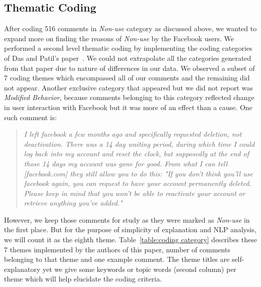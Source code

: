 \subsection{Thematic Coding}
After coding 516 comments in \emph{Non-use} category as discussed above, we wanted to expand more on finding the reasons of \emph{Non-use} by the Facebook users. We performed a second level thematic coding by implementing the coding categories of Das and Patil's paper~\cite{das2017resistance}. We could not extrapolate all the categories generated from that paper due to nature of differences in our data. We observed a subset of 7 coding themes which encompassed all of our comments and the remaining did not appear. Another exclusive category that appeared but we did not report was \textit{Modified Behavior}, because comments belonging to this category reflected change in user interaction with Facebook but it was more of an effect than a cause. One such comment is:

\begin{quote}
    \textit{I left facebook a few months ago and specifically requested deletion, not deactivation. There was a 14 day waiting period, during which time I could log back into my account and reset the clock, but supposedly at the end of those 14 days my account was gone for good. From what I can tell [facebook.com] they still allow you to do this: "If you don't think you'll use facebook again, you can request to have your account permanently deleted. Please keep in mind that you won't be able to reactivate your account or retrieve anything you've added."}

\end{quote}

However, we keep those comments for study as they were marked as \textit{Non-use} in the first place. But for the purpose of simplicity of explanation and NLP analysis, we will count it as the eighth theme. Table~\ref{table:coding category} describes these 7 themes implemented by the authors of this paper, number of comments belonging to that theme and one example comment. The theme titles are self-explanatory yet we give some keywords or topic words (second column) per theme which will help elucidate the coding criteria.    


